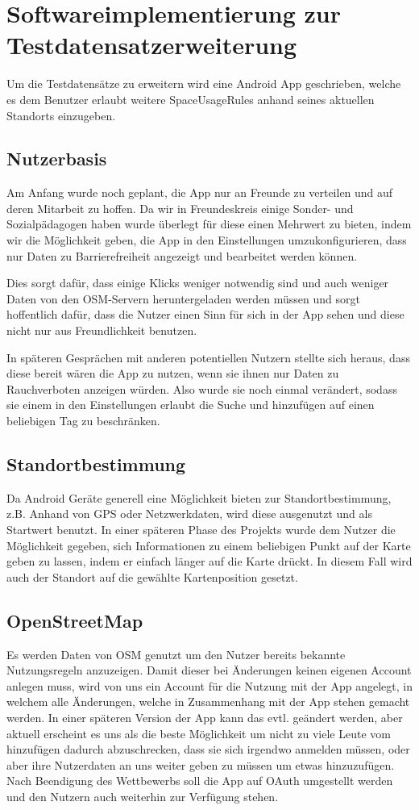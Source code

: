 \section{Softwareimplementierung zur Testdatensatzerweiterung}
\label{sec:HelferApp}
Um die Testdatensätze zu erweitern wird eine Android App geschrieben, welche es dem
Benutzer erlaubt weitere SpaceUsageRules anhand seines aktuellen Standorts einzugeben.

\subsection{Nutzerbasis}
Am Anfang wurde noch geplant, die App nur an Freunde zu verteilen und auf deren Mitarbeit zu hoffen.
Da wir in Freundeskreis einige Sonder- und Sozialpädagogen haben wurde überlegt für diese einen Mehrwert zu bieten,
indem wir die Möglichkeit geben, die App in den Einstellungen umzukonfigurieren, dass nur Daten zu Barrierefreiheit angezeigt und bearbeitet werden können.

Dies sorgt dafür, dass einige Klicks weniger notwendig sind und auch weniger Daten von den OSM-Servern heruntergeladen werden müssen
und sorgt hoffentlich dafür, dass die Nutzer einen Sinn für sich in der App sehen und diese nicht nur aus Freundlichkeit benutzen.

In späteren Gesprächen mit anderen potentiellen Nutzern stellte sich heraus, dass diese bereit wären die App zu nutzen,
wenn sie ihnen nur Daten zu Rauchverboten anzeigen würden.
Also wurde sie noch einmal verändert, sodass sie einem in den Einstellungen erlaubt die Suche und hinzufügen auf einen beliebigen Tag zu beschränken.

\subsection{Standortbestimmung}
Da Android Geräte generell eine Möglichkeit bieten zur Standortbestimmung, z.B. Anhand von GPS oder Netzwerkdaten,
wird diese ausgenutzt und als Startwert benutzt.
In einer späteren Phase des Projekts wurde dem Nutzer die Möglichkeit gegeben, sich Informationen zu einem beliebigen Punkt auf der Karte geben zu lassen,
indem er einfach länger auf die Karte drückt. In diesem Fall wird auch der Standort auf die gewählte Kartenposition gesetzt.

\subsection{OpenStreetMap}
Es werden Daten von OSM genutzt um den Nutzer bereits bekannte Nutzungsregeln anzuzeigen.
Damit dieser bei Änderungen keinen eigenen Account anlegen muss, wird von uns ein Account für die Nutzung mit der App angelegt,
in welchem alle Änderungen, welche in Zusammenhang mit der App stehen gemacht werden.
In einer späteren Version der App kann das evtl. geändert werden, aber aktuell erscheint es uns als die beste Möglichkeit
um nicht zu viele Leute vom hinzufügen dadurch abzuschrecken, dass sie sich irgendwo anmelden müssen,
oder aber ihre Nutzerdaten an uns weiter geben zu müssen um etwas hinzuzufügen.
Nach Beendigung des Wettbewerbs soll die App auf OAuth umgestellt werden und den Nutzern auch weiterhin zur Verfügung stehen.

